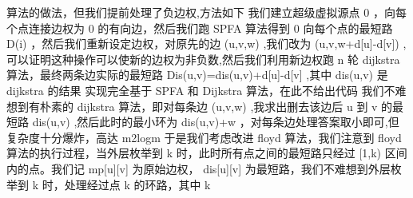 {}\markdownRendererDollarSign{}算法的做法，但我们提前处理了负边权,方法如下\markdownRendererParagraphSeparator
{}我们建立超级虚拟源点\markdownRendererDollarSign{} 0 \markdownRendererDollarSign{}，向每个点连接边权为\markdownRendererDollarSign{} 0 \markdownRendererDollarSign{}的有向边，然后我们跑\markdownRendererDollarSign{} SPFA\markdownRendererSoftLineBreak
{}\markdownRendererDollarSign{}算法得到\markdownRendererDollarSign{} 0 \markdownRendererDollarSign{}向每个点的最短路\markdownRendererDollarSign{} D(i) \markdownRendererDollarSign{}，然后我们重新设定边权，对原先的边\markdownRendererDollarSign{} (u,v,w) \markdownRendererDollarSign{},我们改为\markdownRendererDollarSign{} (u,v,w+d[u]-d[v]) \markdownRendererDollarSign{},可以证明这种操作可以使新的边权为非负数,然后我们利用新边权跑\markdownRendererDollarSign{} n \markdownRendererDollarSign{}轮\markdownRendererDollarSign{} dijkstra \markdownRendererDollarSign{}算法，最终两条边实际的最短路\markdownRendererDollarSign{} Dis(u,v)=dis(u,v)+d[u]-d[v] \markdownRendererDollarSign{},其中\markdownRendererDollarSign{} dis(u,v) \markdownRendererDollarSign{}是\markdownRendererDollarSign{} dijkstra \markdownRendererDollarSign{}的结果\markdownRendererParagraphSeparator
{}实现完全基于\markdownRendererDollarSign{} SPFA\markdownRendererSoftLineBreak
{}\markdownRendererDollarSign{}和\markdownRendererDollarSign{} Dijkstra \markdownRendererDollarSign{}算法，在此不给出代码\markdownRendererInterblockSeparator
{}
\markdownRendererSectionEnd \markdownRendererSectionBegin
{}\markdownRendererInterblockSeparator
{}我们不难想到有朴素的\markdownRendererDollarSign{} dijkstra \markdownRendererDollarSign{}算法，即对每条边\markdownRendererDollarSign{} (u,v,w) \markdownRendererDollarSign{},我求出删去该边后\markdownRendererDollarSign{} u \markdownRendererDollarSign{}到\markdownRendererDollarSign{} v \markdownRendererDollarSign{}的最短路\markdownRendererDollarSign{} dis(u,v) \markdownRendererDollarSign{},然后此时的最小环为\markdownRendererDollarSign{} dis(u,v)+w \markdownRendererDollarSign{}，对每条边处理答案取小即可,但复杂度十分爆炸，高达\markdownRendererDollarSign{} m\markdownRendererCircumflex{}2logm \markdownRendererDollarSign{}\markdownRendererParagraphSeparator
{}于是我们考虑改进\markdownRendererDollarSign{} floyd \markdownRendererDollarSign{}算法，我们注意到\markdownRendererDollarSign{} floyd \markdownRendererDollarSign{}算法的执行过程，当外层枚举到\markdownRendererDollarSign{} k \markdownRendererDollarSign{}时，此时所有点之间的最短路只经过\markdownRendererDollarSign{} [1,k) \markdownRendererDollarSign{}区间内的点。我们记\markdownRendererDollarSign{} mp[u][v] \markdownRendererDollarSign{}为原始边权，\markdownRendererDollarSign{} dis[u][v] \markdownRendererDollarSign{}为最短路，我们不难想到外层枚举到\markdownRendererDollarSign{} k \markdownRendererDollarSign{}时，处理经过点\markdownRendererDollarSign{} k \markdownRendererDollarSign{}的环路，其中\markdownRendererDollarSign{} k\markdownRendererSoftLineBreak

